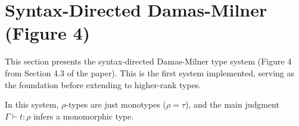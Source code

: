 \documentclass[11pt,a4paper]{article}
\begin{document}
\section{Syntax-Directed Damas-Milner (Figure 4)}

This section presents the syntax-directed Damas-Milner type system (Figure 4 from Section 4.3 of the paper). This is the first system implemented, serving as the foundation before extending to higher-rank types.

In this system, $\rho$-types are just monotypes ($\rho = \tau$), and the main judgment $\Gamma \vdash t : \rho$ infers a monomorphic type.

\begin{figure}[htbp]
\centering
{}
\end{figure}
\end{document}

